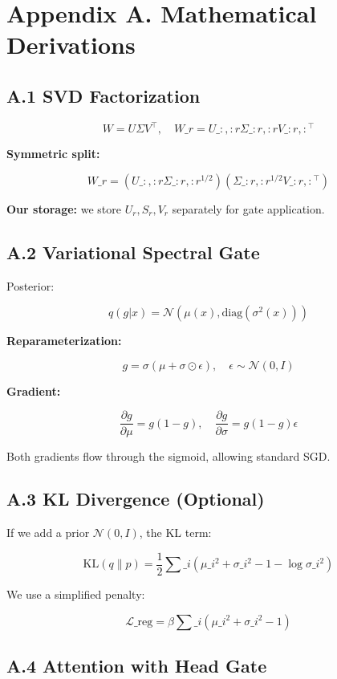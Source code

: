 \section{Appendix A. Mathematical Derivations}

\subsection{A.1 SVD Factorization}

\[
W = U \Sigma V^\top, \quad W\_r = U\_{:, :r} \Sigma\_{:r, :r} V\_{:r, :}^\top
\tag{A.1}
\]

\textbf{Symmetric split:}

\[
W\_r = (U\_{:, :r} \Sigma\_{:r, :r}^{1/2}) (\Sigma\_{:r, :r}^{1/2} V\_{:r, :}^\top)
\tag{A.2}
\]

\textbf{Our storage:} we store $U_r, S_r, V_r$ separately for gate application.

\subsection{A.2 Variational Spectral Gate}

Posterior:

\[
q(g | x) = \mathcal{N}(\mu(x), \text{diag}(\sigma^2(x)))
\tag{A.3}
\]

\textbf{Reparameterization:}

\[
g = \sigma(\mu + \sigma \odot \epsilon), \quad \epsilon \sim \mathcal{N}(0, I)
\tag{A.4}
\]

\textbf{Gradient:}

\[
\frac{\partial g}{\partial \mu} = g(1 - g), \quad
\frac{\partial g}{\partial \sigma} = g(1 - g) \epsilon
\tag{A.5}
\]

Both gradients flow through the sigmoid, allowing standard SGD.

\subsection{A.3 KL Divergence (Optional)}

If we add a prior $\mathcal{N}(0, I)$, the KL term:

\[
\text{KL}(q \| p) = \frac{1}{2} \sum\_i \left(\mu\_i^2 + \sigma\_i^2 - 1 - \log \sigma\_i^2\right)
\tag{A.6}
\]

We use a simplified penalty:

\[
\mathcal{L}\_\text{reg} = \beta \sum\_i (\mu\_i^2 + \sigma\_i^2 - 1)
\tag{A.7}
\]

\subsection{A.4 Attention with Head Gate}

